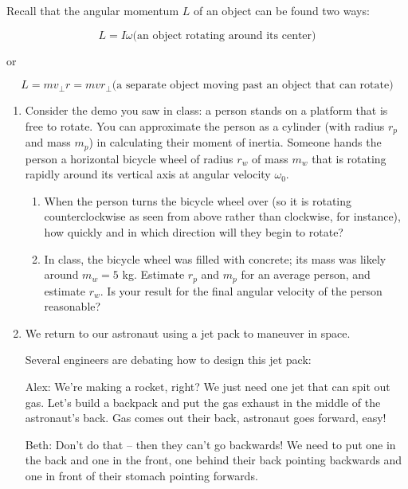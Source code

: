 \documentclass[12pt]{article}
\begin{document}
\Large
\centerline{}

\normalsize
\centerline{}

Recall that the angular momentum $L$ of an object can be found two ways:

$$L = I \omega \text{(an object rotating around its center)}$$

or

$$L = mv_\perp r = mvr_\perp \text{(a separate object moving past an object that can rotate)}$$

\newpage

\begin{enumerate}

	\item Consider the demo you saw in class: a person stands on a platform that is free to rotate. You can approximate the person as a cylinder (with radius $r_p$ and mass $m_p$) in calculating their moment of inertia.
		Someone hands the person a horizontal bicycle wheel of radius $r_w$ of mass $m_w$ that is rotating rapidly around its vertical axis at angular velocity $\omega_0$.

		\begin{enumerate}
			\item When the person turns the bicycle wheel over (so it is rotating counterclockwise as seen from above rather than clockwise, for instance), how quickly and in which direction will they begin to rotate?

			\item In class, the bicycle wheel was filled with concrete; its mass was likely around $m_w = 5$ kg. Estimate $r_p$ and $m_p$ for an average person, and estimate $r_w$. Is your result for the final angular velocity of the person reasonable?
		\end{enumerate}

	\item We return to our astronaut using a jet pack to maneuver in space. 

		\begin{minipage}{0.6\textwidth}
		Several engineers are debating how to design this jet pack:

		Alex: We're making a rocket, right? We just need one jet that can spit out gas. Let's build a backpack and put the gas exhaust in the middle of the astronaut's back. Gas comes out their back, astronaut goes forward, easy!

		Beth: Don't do that -- then they can't go backwards! We need to put one in the back and one in the front, one behind their back pointing backwards and one in front of their stomach pointing forwards.


\end{minipage}
\end{enumerate}
\end{document}
